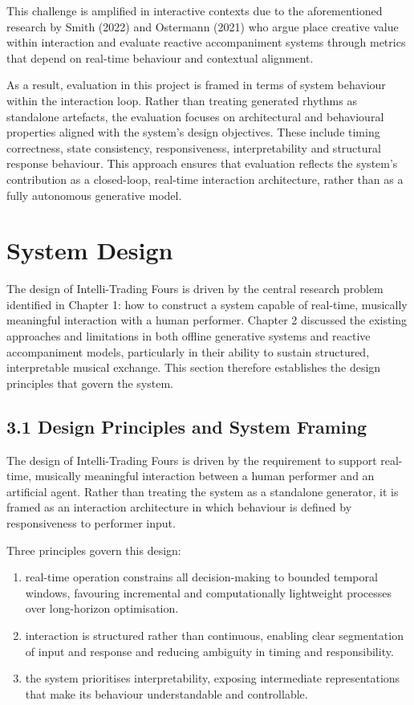 This challenge is amplified in interactive contexts due to the
aforementioned research by Smith (2022) and Ostermann (2021) who argue
place creative value within interaction and evaluate reactive
accompaniment systems through metrics that depend on real-time behaviour
and contextual alignment.

As a result, evaluation in this project is framed in terms of system
behaviour within the interaction loop. Rather than treating generated
rhythms as standalone artefacts, the evaluation focuses on architectural
and behavioural properties aligned with the system's design objectives.
These include timing correctness, state consistency, responsiveness,
interpretability and structural response behaviour. This approach
ensures that evaluation reflects the system's contribution as a
closed-loop, real-time interaction architecture, rather than as a fully
autonomous generative model.

\section{System Design}\label{system-design}

The design of Intelli-Trading Fours is driven by the central research
problem identified in Chapter 1: how to construct a system capable of
real-time, musically meaningful interaction with a human performer.
Chapter 2 discussed the existing approaches and limitations in both
offline generative systems and reactive accompaniment models,
particularly in their ability to sustain structured, interpretable
musical exchange. This section therefore establishes the design
principles that govern the system.

\subsection{3.1 Design Principles and System
Framing}\label{design-principles-and-system-framing}

The design of Intelli-Trading Fours is driven by the requirement to
support real-time, musically meaningful interaction between a human
performer and an artificial agent. Rather than treating the system as a
standalone generator, it is framed as an interaction architecture in
which behaviour is defined by responsiveness to performer input.

Three principles govern this design:

\begin{enumerate}
\def\labelenumi{\arabic{enumi}.}
\item
  real-time operation constrains all decision-making to bounded temporal
  windows, favouring incremental and computationally lightweight
  processes over long-horizon optimisation.
\item
  interaction is structured rather than continuous, enabling clear
  segmentation of input and response and reducing ambiguity in timing
  and responsibility.
\item
  the system prioritises interpretability, exposing intermediate
  representations that make its behaviour understandable and
  controllable.
\end{enumerate}


